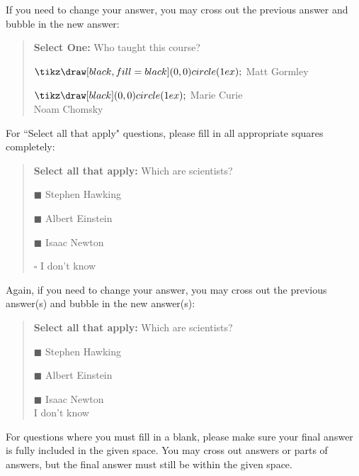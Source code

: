 \documentclass[11pt,addpoints,answers]{exam}
\numberwithin{equation}{section} %
\numberwithin{figure}{section} %
\numberwithin{table}{section} %
\newcommand{\blackcircle}{\tikz\draw[black,fill=black] (0,0) circle (1ex);}
\renewcommand{\circle}{\tikz\draw[black] (0,0) circle (1ex);}
\begin{document}
If you need to change your answer, you may cross out the previous answer and bubble in the new answer:

\begin{quote}
\textbf{Select One:} Who taught this course?
\begin{list}{}
     \item $\blackcircle$ Matt Gormley
     \item $\circle$ Marie Curie\\
     \xcancel{$\blackcircle$}{} Noam Chomsky
\end{list}
\end{quote}


For ``Select all that apply" questions, please fill in all appropriate squares completely:

\begin{quote}
\textbf{Select all that apply:} Which are scientists?
    \begin{list}{}
    \item $\blacksquare$ Stephen Hawking 
    \item $\blacksquare$ Albert Einstein
    \item $\blacksquare$ Isaac Newton
    \item $\square$ I don't know
\end{list}
\end{quote}

Again, if you need to change your answer, you may cross out the previous answer(s) and bubble in the new answer(s):

\begin{quote}
\textbf{Select all that apply:} Which are scientists?
    \begin{list}{}
    \item $\blacksquare$ Stephen Hawking 
    \item $\blacksquare$ Albert Einstein
    \item $\blacksquare$ Isaac Newton\\
    \xcancel{$\blacksquare$} I don't know
\end{list}
\end{quote}

For questions where you must fill in a blank, please make sure your final answer is fully included in the given space. You may cross out answers or parts of answers, but the final answer must still be within the given space.
\end{document}
